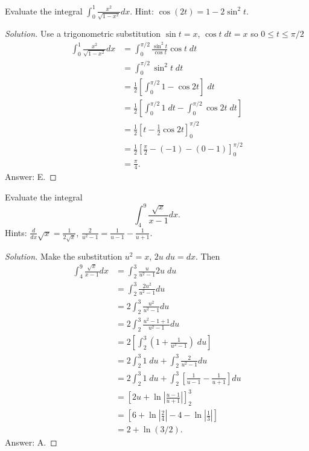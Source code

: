 \begin{problem}
Evaluate the integral
$\displaystyle\int_0^1\frac{x^2}{\sqrt{1-x^2}}dx$. Hint:
$\cos(2t)=1-2\sin^2 t$.
\end{problem}
\begin{proof}[Solution]
Use a trigonometric substitution $\sin t=x$, $\cos t\;dt= x$ so $0\leq
t\leq\pi/2$
\begin{align*}
\int_0^1\frac{x^2}{\sqrt{1-x^2}}dx
&=\int_0^{\pi/2}\frac{\sin^2 t}{\cos t}\cos t\;dt\\
&=\int_0^{\pi/2}\sin^2 t\;dt\\
&=\frac{1}{2}\left[\int_0^{\pi/2}1-\cos 2t\right]\;dt\\
&=\frac{1}{2}\left[\int_0^{\pi/2}1\;dt-\int_0^{\pi/2}\cos 2t\;dt\right]\\
&=\frac{1}{2}\left[t-\frac{1}{2}\cos 2t\right]_0^{\pi/2}\\
&=\frac{1}{2}\left[\frac{\pi}{2}-(-1)-\left(0-1\right)\right]_0^{\pi/2}\\
&=\boxed{\frac{\pi}{4}.}
\end{align*}
Answer: {\color{Red} E.}
\end{proof}

\begin{problem}
Evaluate the integral
\[
\int_4^9\frac{\sqrt{x}}{x-1}dx.
\]
Hints: $\displaystyle\frac{d}{dx}\sqrt{x}=\frac{1}{2\sqrt{x}}$,
$\displaystyle\frac{2}{u^2-1}=\frac{1}{u-1}-\frac{1}{u+1}$.
\end{problem}
\begin{proof}[Solution]
Make the substitution $u^2=x$, $2u\;du=dx$. Then
\begin{align*}
\int_4^9\frac{\sqrt{x}}{x-1}dx
&=\int_2^3\frac{u}{u^2-1}2u\;du\\
&=\int_2^3\frac{2u^2}{u^2-1}du\\
&=2\int_2^3\frac{u^2}{u^2-1}du\\
&=2\int_2^3\frac{u^2-1+1}{u^2-1}du\\
&=2\left[\int_2^3\left(1+\frac{1}{u^2-1}\right)\;du\right]\\
&=2\int_2^3 1\;du+\int_2^3\frac{2}{u^2-1}du\\
&=2\int_2^3 1\;du+\int_2^3\left[\frac{1}{u-1}-\frac{1}{u+1}\right]du\\
&=\left[2u+\ln\left|\frac{u-1}{u+1}\right|\right]_2^3\\
&=\left[6+\ln\left|\frac{2}{4}\right|-4-\ln\left|\frac{1}{3}\right|\right]\\
&=\boxed{2+\ln(3/2)}.
\end{align*}
Answer: {\color{Red} A.}
\end{proof}

